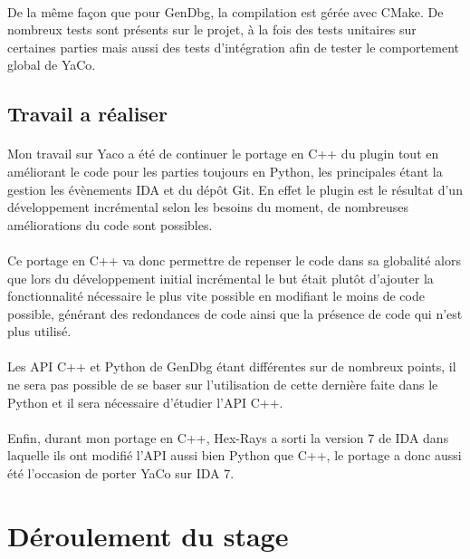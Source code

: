 \documentclass[11pt, book, english, french, standardlists]{upmethodology-document}
\begin{document}
				\paragraph*{}
					De la même façon que pour GenDbg, la compilation est gérée avec CMake. De nombreux tests sont présents sur le projet, à la fois des tests unitaires sur certaines parties mais aussi des tests d'intégration afin de tester le comportement global de YaCo.
			\subsection{Travail a réaliser}
				\paragraph*{}
					Mon travail sur Yaco a été de continuer le portage en C++ du plugin tout en améliorant le code pour les parties toujours en Python, les principales étant la gestion les évènements IDA et du dépôt Git. En effet le plugin est le résultat d'un développement incrémental selon les besoins du moment, de nombreuses améliorations du code sont possibles.
				\paragraph*{}
					Ce portage en C++ va donc permettre de repenser le code dans sa globalité alors que lors du développement initial incrémental le but était plutôt d'ajouter la fonctionnalité nécessaire le plus vite possible en modifiant le moins de code possible, générant des redondances de code ainsi que la présence de code qui n'est plus utilisé.
				\paragraph*{}
					Les \gls{API} C++ et Python de GenDbg étant différentes sur de nombreux points, il ne sera pas possible de se baser sur l'utilisation de cette dernière faite dans le Python et il sera nécessaire d'étudier l'\gls{API} C++.
				\paragraph*{}
					Enfin, durant mon portage en C++, Hex-Rays a sorti la version 7 de IDA dans laquelle ils ont modifié l'\gls{API} aussi bien Python que C++, le portage a donc aussi été l’occasion de porter YaCo sur IDA 7.
		\section{Déroulement du stage}
\end{document}
